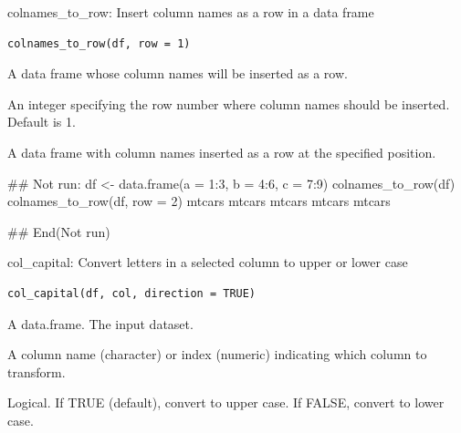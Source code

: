 \documentclass[a4paper]{book}
\begin{document}
%
\begin{Description}
colnames\_to\_row: Insert column names as a row in a data frame
\end{Description}
%
\begin{Usage}
\begin{verbatim}
colnames_to_row(df, row = 1)
\end{verbatim}
\end{Usage}
%
\begin{Arguments}
\begin{ldescription}
\item[\code{df}] A data frame whose column names will be inserted as a row.

\item[\code{row}] An integer specifying the row number where column names should be inserted. Default is 1.
\end{ldescription}
\end{Arguments}
%
\begin{Value}
A data frame with column names inserted as a row at the specified position.
\end{Value}
%
\begin{Examples}
\begin{ExampleCode}
## Not run: 
df <- data.frame(a = 1:3, b = 4:6, c = 7:9)
colnames_to_row(df)
colnames_to_row(df, row = 2)
mtcars
mtcars %
mtcars %
mtcars %
mtcars %

## End(Not run)
\end{ExampleCode}
\end{Examples}
%
\begin{Description}
col\_capital: Convert letters in a selected column to upper or lower case
\end{Description}
%
\begin{Usage}
\begin{verbatim}
col_capital(df, col, direction = TRUE)
\end{verbatim}
\end{Usage}
%
\begin{Arguments}
\begin{ldescription}
\item[\code{df}] A data.frame. The input dataset.

\item[\code{col}] A column name (character) or index (numeric) indicating which column to transform.

\item[\code{direction}] Logical. If TRUE (default), convert to upper case. If FALSE, convert to lower case.
\end{ldescription}
\end{Arguments}
\end{document}

